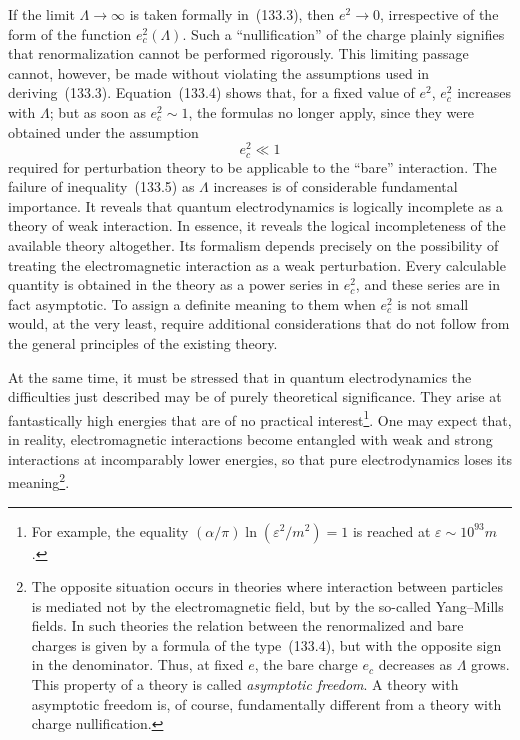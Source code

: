 If the limit $\Lambda\to\infty$ is taken formally in~(133.3), then $e^2\to0$, irrespective of the form of the function $e_c^2(\Lambda)$. Such a ``nullification'' of the charge plainly signifies that renormalization cannot be performed rigorously. This limiting passage cannot, however,
be made without violating the assumptions used in deriving~(133.3). Equation~(133.4) shows that, for a fixed value of $e^2$, $e_c^2$ increases with $\Lambda$; but as soon as $e_c^2\sim1$, the formulas no longer apply, since they were obtained under the assumption
\begin{equation}
e_c^2\ll1
\tag{133.5}
\end{equation}
required for perturbation theory to be applicable to the ``bare'' interaction. The failure of inequality~(133.5) as $\Lambda$ increases is of considerable fundamental importance. It reveals that quantum electrodynamics is logically incomplete as a theory of weak interaction. In essence, it reveals the logical incompleteness of the available theory altogether. Its formalism depends precisely on the possibility of treating the electromagnetic interaction as a weak perturbation. Every calculable quantity is obtained in the theory as a power series in $e_c^2$, and these series are in fact asymptotic. To assign a definite meaning to them when $e_c^2$ is not small would, at the very least, require additional considerations that do not follow from the general principles of the existing theory.

At the same time, it must be stressed that in quantum electrodynamics the difficulties just described may be of purely theoretical significance. They arise at fantastically high energies that are of no practical interest\footnote{For example, the equality $(\alpha/\pi)\ln(\varepsilon^2/m^2)=1$ is reached at $\varepsilon\sim10^{93}m$.}. One may expect that, in reality, electromagnetic interactions become entangled with weak and strong interactions at incomparably lower energies, so that pure electrodynamics loses its meaning\footnote{The opposite situation occurs in theories where interaction between particles is mediated not by the electromagnetic field, but by the so-called Yang--Mills fields. In such theories the relation between the renormalized and bare charges is given by a formula of the type~(133.4), but with the opposite sign in the denominator. Thus, at fixed $e$, the bare charge $e_c$ decreases as $\Lambda$ grows. This property of a theory is called \emph{asymptotic freedom}. A theory with asymptotic freedom is, of course, fundamentally different from a theory with charge nullification.}.

